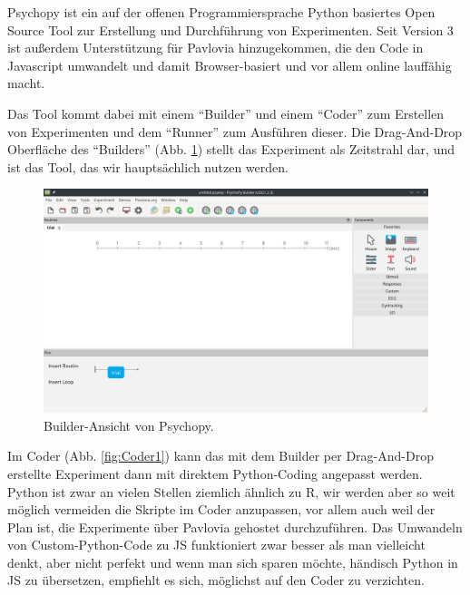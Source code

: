 \documentclass[
]{book}
\begin{document}
Psychopy ist ein auf der offenen Programmiersprache Python basiertes Open Source Tool zur Erstellung und Durchführung von Experimenten.
Seit Version 3 ist außerdem Unterstützung für Pavlovia hinzugekommen, die den Code in Javascript umwandelt und damit Browser-basiert und vor allem online lauffähig macht.

Das Tool kommt dabei mit einem ``Builder'' und einem ``Coder'' zum Erstellen von Experimenten und dem ``Runner'' zum Ausführen dieser.
Die Drag-And-Drop Oberfläche des ``Builders'' (Abb. \ref{fig:Builder1}) stellt das Experiment als Zeitstrahl dar, und ist das Tool, das wir hauptsächlich nutzen werden.



\begin{figure}

{\centering \includegraphics[width=.8\textwidth]{imgs/Builder} 

}

\caption{Builder-Ansicht von Psychopy.}\label{fig:Builder1}
\end{figure}

Im Coder (Abb. \ref{fig:Coder1}) kann das mit dem Builder per Drag-And-Drop erstellte Experiment dann mit direktem Python-Coding angepasst werden. Python ist zwar an vielen Stellen ziemlich ähnlich zu R, wir werden aber so weit möglich vermeiden die Skripte im Coder anzupassen, vor allem auch weil der Plan ist, die Experimente über Pavlovia gehostet durchzuführen. Das Umwandeln von Custom-Python-Code zu JS funktioniert zwar besser als man vielleicht denkt, aber nicht perfekt und wenn man sich sparen möchte, händisch Python in JS zu übersetzen, empfiehlt es sich, möglichst auf den Coder zu verzichten.
\end{document}
